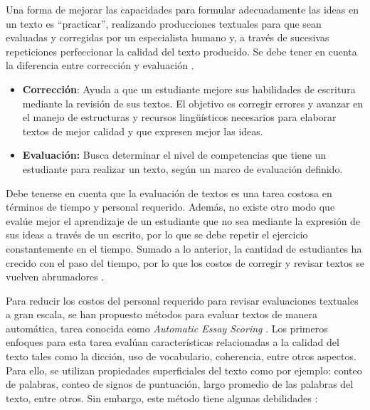 \documentclass[12pt]{diicc}
\begin{document}
Una forma de mejorar las capacidades para formular adecuadamente las ideas en un texto es ``practicar'', realizando producciones textuales para que sean evaluadas y corregidas por un especialista humano y, a través de sucesivas repeticiones perfeccionar la calidad del texto producido. Se debe tener en cuenta la diferencia entre corrección y evaluación \cite{t18}.

\begin{itemize}
	\item {\bf Corrección}: Ayuda a que un estudiante mejore sus habilidades de escritura mediante la revisión de sus textos. El objetivo es corregir errores y avanzar en el manejo de estructuras y recursos lingüísticos necesarios para elaborar textos de mejor calidad y que expresen mejor las ideas.
	\item {\bf Evaluación:} Busca determinar el nivel de competencias que tiene un estudiante para realizar un texto, según un marco de evaluación definido.
\end{itemize}

Debe tenerse en cuenta que la evaluación de textos es una tarea costosa en términos de tiempo y personal requerido. Además, no existe otro modo que evalúe mejor el aprendizaje de un estudiante que no sea mediante la expresión de sus ideas a través de un escrito, por lo que se debe repetir el ejercicio constantemente en el tiempo. Sumado a lo anterior, la cantidad de estudiantes ha crecido con el paso del tiempo, por lo que los costos de corregir y revisar textos se vuelven abrumadores \cite{t10}.

Para reducir los costos del personal requerido para revisar evaluaciones textuales a gran escala, se han propuesto métodos para evaluar textos de manera automática, tarea conocida como {\em Automatic Essay Scoring} \cite{t9}. Los primeros enfoques para esta tarea evalúan características relacionadas a la calidad del texto tales como la dicción, uso de vocabulario, coherencia, entre otros aspectos. Para ello, se utilizan propiedades superficiales del texto como por ejemplo: conteo de palabras, conteo de signos de puntuación, largo promedio de las palabras del texto, entre otros. Sin embargo, este método tiene algunas debilidades \cite{t24}\cite{t25}:
\end{document}
